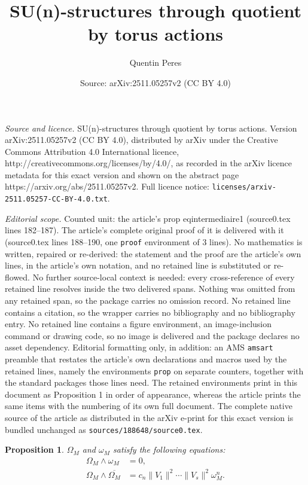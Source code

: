 \documentclass[10pt,a4paper]{amsart}
\title{SU(n)-structures through quotient by torus actions}
\author{Quentin Peres}
\date{Source: arXiv:2511.05257v2 (CC BY 4.0)}
\newtheorem{prop}{Proposition}
\begin{document}
\maketitle

\noindent\emph{Source and licence.} SU(n)-structures through quotient by torus actions. Version arXiv:2511.05257v2 (CC BY 4.0), distributed by arXiv under the Creative Commons Attribution 4.0 International licence, http://creativecommons.org/licenses/by/4.0/, as recorded in the arXiv licence metadata for this exact version and shown on the abstract page https://arxiv.org/abs/2511.05257v2. Full licence notice: \texttt{licenses/arxiv-2511.05257-CC-BY-4.0.txt}.\par\smallskip

\noindent\textit{Editorial scope.} Counted unit: the article's prop eqintermediaire1 (source0.tex lines 182--187). The article's complete original proof of it is delivered with it (source0.tex lines 188--190, one \texttt{proof} environment of 3 lines). No mathematics is written, repaired or re-derived: the statement and the proof are the article's own lines, in the article's own notation, and no retained line is substituted or re-flowed.  No further source-local context is needed: every cross-reference of every retained line resolves inside the two delivered spans.  Nothing was omitted from any retained span, so the package carries no omission record.  No retained line contains a citation, so the wrapper carries no bibliography and no bibliography entry.  No retained line contains a figure environment, an image-inclusion command or drawing code, so no image is delivered and the package declares no asset dependency.  Editorial formatting only, in addition: an AMS \texttt{amsart} preamble that restates the article's own declarations and macros used by the retained lines, namely the environments \texttt{prop} on separate counters, together with the standard packages those lines need.  The retained environments print in this document as Proposition 1 in order of appearance, whereas the article prints the same items with the numbering of its own full document.  The complete native source of the article as distributed in the arXiv e-print for this exact version is bundled unchanged as \texttt{sources/188648/source0.tex}.
\begin{prop} $\Omega_M$ and $\omega_M$ satisfy the following equations:
    \begin{align}
        \Omega_M\wedge\omega_M&=0, \label{eqintermediaire1} \\
        \Omega_M\wedge\overline{\Omega_M}&=c_n\|V_1\|^2\cdots\|V_s\|^2\omega_M^n.\label{eqintermediaire2}
    \end{align}
\end{prop}
\end{document}
